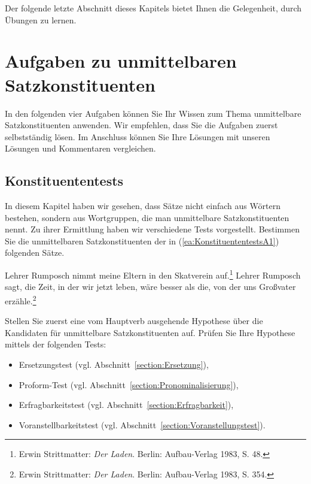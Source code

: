 Der folgende letzte Abschnitt dieses Kapitels bietet Ihnen die Gelegenheit, durch Übungen zu lernen.

\section{Aufgaben zu unmittelbaren Satzkonstituenten}\label{section:Aufgaben_Konstituenz}

In den folgenden vier Aufgaben können Sie Ihr Wissen zum Thema unmittelbare Satzkonstituenten anwenden. Wir empfehlen, dass Sie die Aufgaben zuerst selbstständig lösen. Im Anschluss können Sie Ihre Lösungen mit unseren Lösungen und Kommentaren vergleichen.


\subsection{Konstituententests}\label{subsection:A_Konstituenz1}

In diesem Kapitel haben wir gesehen, dass Sätze nicht einfach aus Wörtern bestehen, sondern aus Wortgruppen, die man unmittelbare Satzkonstituenten nennt. Zu ihrer Ermittlung haben wir verschiedene Tests vorgestellt. Bestimmen Sie die unmittelbaren Satzkonstituenten der in (\ref{ea:KonstituententestsA1}) folgenden Sätze.

\ea \label{ea:KonstituententestsA1}
\ea  \label{ea:KonstituententestsA1_1} Lehrer Rumposch nimmt meine Eltern in den Skatverein auf.\footnote{Erwin Strittmatter: \textit{Der Laden}. Berlin: Aufbau-Verlag 1983, S. 48.}  
\ex \label{ea:KonstituententestsA1_2} Lehrer Rumposch sagt, die Zeit, in der wir jetzt leben, wäre besser als die, von der uns Großvater erzähle.\footnote{Erwin Strittmatter: \textit{Der Laden}. Berlin: Aufbau-Verlag 1983, S. 354.}
\z 
\z 

Stellen Sie zuerst eine vom Hauptverb ausgehende Hypothese über die Kandidaten für unmittelbare Satzkonstituenten auf. Prüfen Sie Ihre Hypothese mittels der folgenden Tests:

\newpage

\begin{itemize}
\item Ersetzungstest (vgl. Abschnitt~\ref{section:Ersetzung}), 
\item Proform-Test (vgl. Abschnitt~\ref{section:Pronominalisierung}), 
\item Erfragbarkeitstest (vgl. Abschnitt~\ref{section:Erfragbarkeit}), 
\item Voranstellbarkeitstest (vgl. Abschnitt~\ref{section:Voranstellungstest}).

\end{itemize}


